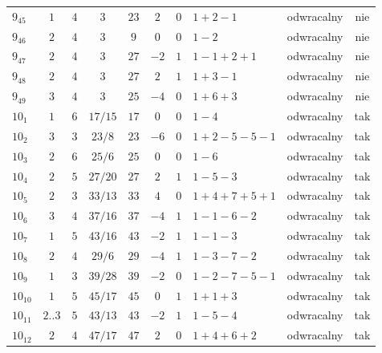 \begin{longtable}{lccccccllc}
$9_{45}$    &  $1$     &  $4$  &  $3$      &  $23$   &  $2$   &  $0$  &  $1+2-1$        &  odwracalny  &  nie  \\
$9_{46}$    &  $2$     &  $4$  &  $3$      &  $9$    &  $0$   &  $0$  &  $1-2$          &  odwracalny  &  nie  \\
$9_{47}$    &  $2$     &  $4$  &  $3$      &  $27$   &  $-2$  &  $1$  &  $1-1+2+1$      &  odwracalny  &  nie  \\
$9_{48}$    &  $2$     &  $4$  &  $3$      &  $27$   &  $2$   &  $1$  &  $1+3-1$        &  odwracalny  &  nie  \\
$9_{49}$    &  $3$     &  $4$  &  $3$      &  $25$   &  $-4$  &  $0$  &  $1+6+3$        &  odwracalny  &  nie  \\
$10_{1}$    &  $1$     &  $6$  &  $17/15$  &  $17$   &  $0$   &  $0$  &  $1-4$          &  odwracalny  &  tak  \\
$10_{2}$    &  $3$     &  $3$  &  $23/8$   &  $23$   &  $-6$  &  $0$  &  $1+2-5-5-1$    &  odwracalny  &  tak  \\
$10_{3}$    &  $2$     &  $6$  &  $25/6$   &  $25$   &  $0$   &  $0$  &  $1-6$          &  odwracalny  &  tak  \\
$10_{4}$    &  $2$     &  $5$  &  $27/20$  &  $27$   &  $2$   &  $1$  &  $1-5-3$        &  odwracalny  &  tak  \\
$10_{5}$    &  $2$     &  $3$  &  $33/13$  &  $33$   &  $4$   &  $0$  &  $1+4+7+5+1$    &  odwracalny  &  tak  \\
$10_{6}$    &  $3$     &  $4$  &  $37/16$  &  $37$   &  $-4$  &  $1$  &  $1-1-6-2$      &  odwracalny  &  tak  \\
$10_{7}$    &  $1$     &  $5$  &  $43/16$  &  $43$   &  $-2$  &  $1$  &  $1-1-3$        &  odwracalny  &  tak  \\
$10_{8}$    &  $2$     &  $4$  &  $29/6$   &  $29$   &  $-4$  &  $1$  &  $1-3-7-2$      &  odwracalny  &  tak  \\
$10_{9}$    &  $1$     &  $3$  &  $39/28$  &  $39$   &  $-2$  &  $0$  &  $1-2-7-5-1$    &  odwracalny  &  tak  \\
$10_{10}$   &  $1$     &  $5$  &  $45/17$  &  $45$   &  $0$   &  $1$  &  $1+1+3$        &  odwracalny  &  tak  \\
$10_{11}$   &  $2..3$  &  $5$  &  $43/13$  &  $43$   &  $-2$  &  $1$  &  $1-5-4$        &  odwracalny  &  tak  \\
$10_{12}$   &  $2$     &  $4$  &  $47/17$  &  $47$   &  $2$   &  $0$  &  $1+4+6+2$      &  odwracalny  &  tak  \\

\end{longtable}
